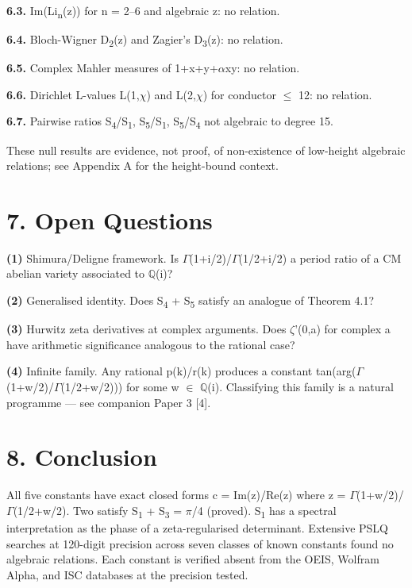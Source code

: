 \documentclass[11pt]{article}
\begin{document}
\textbf{6.3.} Im(Li\textsubscript{n}(z)) for n = 2--6 and algebraic z:
no relation.

\textbf{6.4.} Bloch-Wigner D\textsubscript{2}(z) and Zagier's
D\textsubscript{3}(z): no relation.

\textbf{6.5.} Complex Mahler measures of 1+x+y+\(\alpha\)xy: no
relation.

\textbf{6.6.} Dirichlet L-values L(1,\(\chi\)) and L(2,\(\chi\)) for
conductor \(\leq\) 12: no relation.

\textbf{6.7.} Pairwise ratios S\textsubscript{4}/S\textsubscript{1},
S\textsubscript{5}/S\textsubscript{1},
S\textsubscript{5}/S\textsubscript{4} not algebraic to degree 15.

These null results are evidence, not proof, of non-existence of
low-height algebraic relations; see Appendix A for the height-bound
context.

\hypertarget{open-questions}{%
\section{7. Open Questions}\label{open-questions}}

\textbf{(1)} Shimura/Deligne framework. Is
\(\Gamma\)(1+i/2)/\(\Gamma\)(1/2+i/2) a period ratio of a CM abelian
variety associated to \(\mathbb{Q}\)(i)?

\textbf{(2)} Generalised identity. Does S\textsubscript{4} +
S\textsubscript{5} satisfy an analogue of Theorem 4.1?

\textbf{(3)} Hurwitz zeta derivatives at complex arguments. Does
\(\zeta\)'(0,a) for complex a have arithmetic significance analogous to
the rational case?

\textbf{(4)} Infinite family. Any rational p(k)/r(k) produces a constant
\textbar tan(arg(\(\Gamma\)(1+w/2)/\(\Gamma\)(1/2+w/2)))\textbar{} for
some w \(\in\) \(\mathbb{Q}\)(i). Classifying this family is a natural
programme --- see companion Paper 3 {[}4{]}.

\hypertarget{conclusion}{%
\section{8. Conclusion}\label{conclusion}}

All five constants have exact closed forms c =
\textbar Im(z)/Re(z)\textbar{} where z =
\(\Gamma\)(1+w/2)/\(\Gamma\)(1/2+w/2). Two satisfy S\textsubscript{1} +
S\textsubscript{3} = \(\pi\)/4 (proved). S\textsubscript{1} has a
spectral interpretation as the phase of a zeta-regularised determinant.
Extensive PSLQ searches at 120-digit precision across seven classes of
known constants found no algebraic relations. Each constant is verified
absent from the OEIS, Wolfram Alpha, and ISC databases at the precision
tested.
\end{document}
